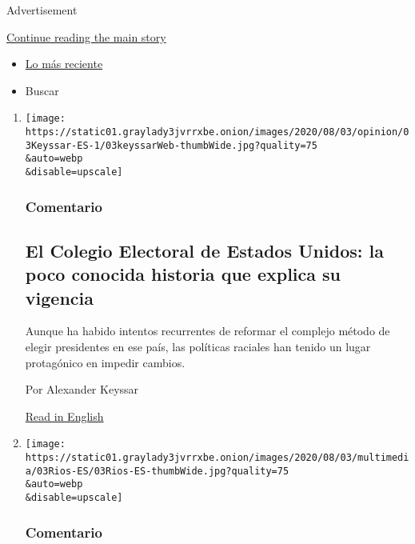 Advertisement

\protect\hyperlink{after-mid1}{Continue reading the main story}

\begin{itemize}
\tightlist
\item
  \protect\hyperlink{stream-panel}{Lo más reciente}
\item
  Buscar
\end{itemize}

\begin{enumerate}
\def\labelenumi{\arabic{enumi}.}
\item
  \href{/es/2020/08/03/espanol/opinion/colegio-electoral-estados-unidos.html}{}

  \texttt{[image: https://static01.graylady3jvrrxbe.onion/images/2020/08/03/opinion/03Keyssar-ES-1/03keyssarWeb-thumbWide.jpg?quality=75\\\&auto=webp\\\&disable=upscale]}

  \hypertarget{comentario-4}{%
  \subsubsection{Comentario}\label{comentario-4}}

  \hypertarget{el-colegio-electoral-de-estados-unidos-la-poco-conocida-historia-que-explica-su-vigencia}{%
  \subsection{El Colegio Electoral de Estados Unidos: la poco conocida
  historia que explica su
  vigencia}\label{el-colegio-electoral-de-estados-unidos-la-poco-conocida-historia-que-explica-su-vigencia}}

  Aunque ha habido intentos recurrentes de reformar el complejo método
  de elegir presidentes en ese país, las políticas raciales han tenido
  un lugar protagónico en impedir cambios.

  Por Alexander Keyssar

  \href{https://www.nytimes3xbfgragh.onion/2020/08/03/opinion/electoral-college-racism-white-supremacy.html}{Read
  in English}
\item
  \href{/es/2020/08/03/espanol/opinion/servicio-salud-mexico.html}{}

  \texttt{[image: https://static01.graylady3jvrrxbe.onion/images/2020/08/03/multimedia/03Rios-ES/03Rios-ES-thumbWide.jpg?quality=75\\\&auto=webp\\\&disable=upscale]}

  \hypertarget{comentario-5}{%
  \subsubsection{Comentario}\label{comentario-5}}


\end{enumerate}
